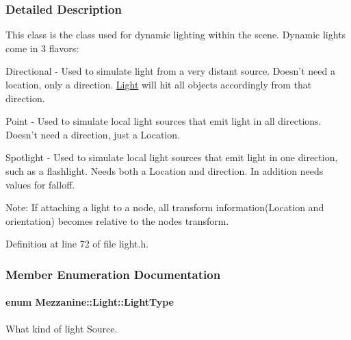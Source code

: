 \subsubsection{Detailed Description}
This class is the class used for dynamic lighting within the scene. Dynamic lights come in 3 flavors: \par
 Directional -\/ Used to simulate light from a very distant source. Doesn't need a location, only a direction. \hyperlink{classMezzanine_1_1Light}{Light} will hit all objects accordingly from that direction. \par
 Point -\/ Used to simulate local light sources that emit light in all directions. Doesn't need a direction, just a Location. \par
 Spotlight -\/ Used to simulate local light sources that emit light in one direction, such as a flashlight. Needs both a Location and direction. In addition needs values for falloff. \par
 Note: If attaching a light to a node, all transform information(Location and orientation) becomes relative to the nodes transform. 

Definition at line 72 of file light.h.



\subsubsection{Member Enumeration Documentation}
\hypertarget{classMezzanine_1_1Light_a783df27d8261c5af2226bc75586944be}{
\paragraph[{LightType}]{\setlength{\rightskip}{0pt plus 5cm}enum {\bf Mezzanine::Light::LightType}}\hfill}
\label{classMezzanine_1_1Light_a783df27d8261c5af2226bc75586944be}


What kind of light Source. 

